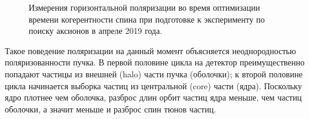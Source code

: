 \begin{figure}[h]\centering
	\caption{Измерения горизонтальной поляризации во время оптимизации времени когерентности спина при подготовке к эксперименту по поиску аксионов в апреле 2019 года.\label{fig:April2019:Polarization}}
\end{figure}

Такое поведение поляризации на данный момент объясняется неоднородностью поляризованности пучка. В первой половине цикла на детектор преимущественно попадают частицы из внешней (halo) части пучка (оболочки); к второй половине цикла начинается выборка частиц из центральной (core) части (ядра). Поскольку ядро плотнее чем оболочка, разброс длин орбит частиц ядра меньше, чем частиц оболочки, а значит меньше и разброс спин тюнов частиц.

